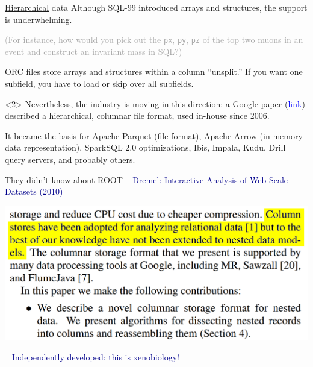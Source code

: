 \documentclass{beamer}
\begin{document}
\begin{frame}{\underline{Hierarchical} data}
\vspace{0.5 cm}
Although SQL-99 introduced arrays and structures, the support is underwhelming.

\vspace{0.3 cm}
\textcolor{darkgray}{(For instance, how would you pick out the {\tt px}, {\tt py}, {\tt pz} of the top two muons in an event and construct an invariant mass in SQL?)}

\vspace{0.3 cm}
ORC files store arrays and structures within a column ``unsplit.'' If you want one subfield, you have to load or skip over all subfields.

\begin{uncoverenv}<2>
\vspace{0.5 cm}
Nevertheless, the industry is moving in this direction: a Google paper (\href{https://research.google.com/pubs/pub36632.html}{\textcolor{blue}{\underline{link}}}) described a hierarchical, columnar file format, used in-house since 2006.

\vspace{0.3 cm}
It became the basis for Apache Parquet (file format), Apache Arrow (in-memory data representation), SparkSQL 2.0 optimizations, Ibis, Impala, Kudu, Drill query servers, and probably others.
\end{uncoverenv}
\end{frame}

\begin{frame}{They didn't know about ROOT}
\vspace{0.5 cm}
\mbox{ } \hfill \textcolor{darkblue}{\large Dremel: Interactive Analysis of Web-Scale Datasets (2010)} \hfill \mbox{ }

\vspace{0.5 cm}
\includegraphics[width=\linewidth]{dremel.png}

\vspace{0.5 cm}
\mbox{ } \hfill \textcolor{darkblue}{\Large Independently developed: this is xenobiology!} \hfill \mbox{ }
\end{frame}
\end{document}
